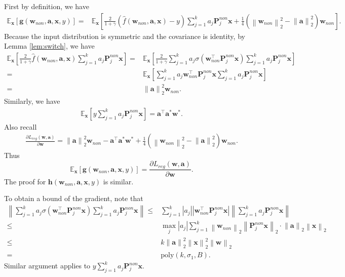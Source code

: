 \documentclass[11pt]{article}
\newcommand{\poly}{\mathrm{poly}}
\newcommand{\mat}[1]{\mathbf{#1}}
\newcommand{\vect}[1]{\mathbf{#1}}
\newcommand{\norm}[1]{\left\|#1\right\|}
\newcommand{\abs}[1]{\left|#1\right|}
\newcommand{\expect}{\mathbb{E}}
\newcommand{\relu}[1]{\sigma\left(#1\right)}
\begin{document}
First by definition, we have
\begin{align*}
\expect_{\vect{x}}\left[\vect{g}\left(\vect{w}_{non},\vect{a},\vect{x},y\right)\right] = & \expect_{\vect{x}} \left[\frac{2}{1+\gamma}\left(
	\hat{f}\left(\vect{w}_{non},\vect{a},\vect{x}\right) - y
	\right) \sum_{j=1}^{k}a_j\mat{P}_j^{non} \vect{x}+\frac{1}{4}\left(\norm{\vect{w}_{non}}_2^2-\norm{\vect{a}}_2^2\right)\vect{w}_{non}\right].
\end{align*}
Because the input distribution is symmetric and the covariance is identity, by Lemma \ref{lem:switch}, we have  \begin{align*}
\expect_{\vect{x}}\left[\frac{2}{1+\gamma} \hat{f}\left(\vect{w}_{non},\vect{a},\vect{x}\right)\sum_{j=1}^{k}a_j\mat{P}_j^{non}\vect{x}\right] = & \expect_{\vect{x}}\left[\frac{2}{1+\gamma} \sum_{j=1}^{k}a_j\relu{\vect{w}_{non}^\top\mat{P}_j^{non}\vect{x}}\sum_{j=1}^{k}a_j\mat{P}_j^{non}\vect{x}\right] \\
= &\expect_{\vect{x}}\left[ \sum_{j=1}^{k}a_j\vect{w}_{non}^\top\mat{P}_j^{non}\vect{x}\sum_{j=1}^{k}a_j\mat{P}_j^{non}\vect{x}\right] \\
= & \norm{\vect{a}}_2^2 \vect{w}_{non}.
\end{align*}
Similarly, we have \begin{align*}
\expect_{\vect{x}}\left[y\sum_{j=1}^{k}a_j\mat{P}_j^{non} \vect{x}\right] = \vect{a}^\top \vect{a}^* \vect{w}^*.
\end{align*}
Also recall \begin{align*}
\frac{\partial L_{reg}\left(\vect{w},\vect{a}\right)}{\partial \vect{w}} = \norm{\vect{a}}_2^2 \vect{w}_{non} - \vect{a}^\top \vect{a}^* \vect{w}^* + \frac{1}{4}\left(\norm{\vect{w}_{non}}_2^2-\norm{\vect{a}}_2^2\right)\vect{w}_{non}.
\end{align*}
Thus \[
\expect_{\vect{x}}\left[\vect{g}\left(\vect{w}_{non},\vect{a},\vect{x},y\right)\right]  = \frac{\partial L_{reg}\left(\vect{w},\vect{a}\right)}{\partial \vect{w}}.
\]
The proof for $\vect{h}\left(\vect{w}_{non},\vect{a},\vect{x},y\right)$ is similar.

To obtain a bound of the gradient, note that \begin{align*}
\norm{\sum_{j=1}^{k}a_j\relu{\vect{w}_{non}^\top\mat{P}_j^{non}\vect{x}}\sum_{j=1}^{k}a_j\mat{P}_j^{non}\vect{x}} \le &\sum_{j=1}^{k}\abs{a_j}\abs{\vect{w}_{non}^\top \mat{P}_j^{non}\vect{x}}\norm{\sum_{j=1}^{k}a_j\mat{P}_j^{non}\vect{x}} \\
\le & \max_{j}\abs{a_j} \sum_{j=1}^{k}\norm{\vect{w}_{non}}_2 \norm{\mat{P}_j^{non}\vect{x}}_2\cdot\norm{\vect{a}}_2\norm{\vect{x}}_2 \\
\le & k \norm{\vect{a}}_2^2 \norm{\vect{x}}_2^2 \norm{\vect{w}}_2 \\
= & \poly\left(k,\sigma_1,B\right).
\end{align*} 
Similar argument applies to $y \sum_{j=1}^{k}a_j\mat{P}_j^{non} \vect{x}$.
\end{document}
